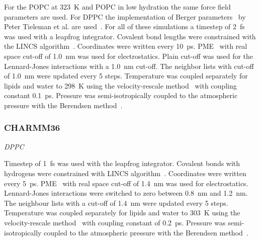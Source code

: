 \documentclass[journal=jacsat,manuscript=article]{achemso}
\begin{document}
For the POPC at 323~K and POPC in low hydration the same force field parameters are used.
For DPPC the implementation of Berger parameters~\cite{berger97} by Peter Tieleman et al. are used~\cite{marrink98}.
For all of these simulations a timestep of 2~fs was used with a leapfrog integrator. Covalent bond lengths were constrained with the LINCS algorithm~\cite{hess97,hess07}. 
Coordinates were written every 10~ps. PME~\cite{darden93,essman95} with real space cut-off of 1.0~nm was used 
for electrostatics. Plain cut-off was used for the Lennard-Jones interactions with a 1.0~nm cut-off.
The neighbor lists with cut-off of 1.0~nm were updated every 5 steps. Temperature was coupled separately
for lipids and water to 298~K using the velocity-rescale method~\cite{bussi07} with coupling constant 0.1~ps.
Pressure was semi-isotropically coupled to the atmospheric pressure with the Berendsen method~\cite{berendsen84}.

\subsubsection{CHARMM36}

{\it DPPC}

Timestep of 1~fs was used with the leapfrog integrator. Covalent bonds with hydrogens were constrained with LINCS algorithm~\cite{hess97,hess07}. 
Coordinates were written every 5~ps. PME~\cite{darden93,essman95} with real space cut-off of 1.4~nm was used 
for electrostatics. Lennard-Jones interactions were switched to zero between 0.8~nm and 1.2~nm.
The neighbour lists with a cut-off of 1.4~nm were updated every 5 steps. Temperature was coupled separately
for lipids and water to 303~K using the velocity-rescale method~\cite{bussi07} with coupling constant of 0.2~ps.
Pressure was semi-isotropically coupled to the atmospheric pressure with the Berendsen method~\cite{berendsen84}.
\end{document}
